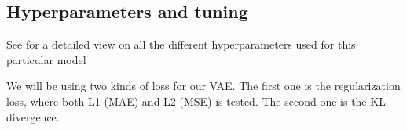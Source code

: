 \subsection{Hyperparameters and tuning}

See \cite{app:hyperparams} for a detailed view on all the different hyperparameters used for this particular model


We will be using two kinds of loss for our VAE. The first one is the regularization loss, where both L1 (MAE) and L2 (MSE) is tested. The second one is the KL divergence.  
